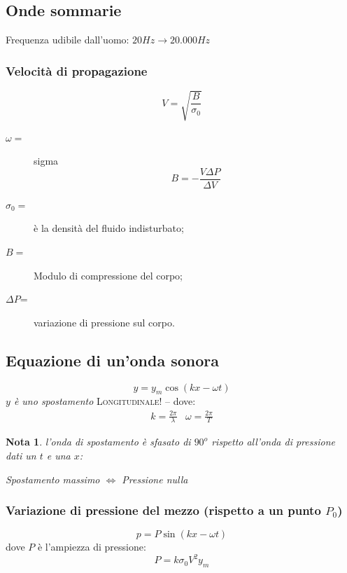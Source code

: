 \documentclass{book}
\newtheorem{nota}{Nota}[section]
\begin{document}
\subsection{Onde sommarie}
\label{sec:ondesom}

Frequenza udibile dall'uomo: $20Hz\to 20.000Hz$

\subsubsection{Velocità di propagazione}
\label{sec:veldiprop}

\begin{equation}
  \label{eq:veldiprop}
  V=\sqrt{\frac{B}{\sigma_0}}
\end{equation}
\begin{description}
\item[$\omega=$] sigma
  \begin{equation*}
    B=-\frac{V\Delta P}{\Delta V}
  \end{equation*}
\item[$\sigma_0=$] è la densità del fluido indisturbato;
\item[$B=$] Modulo di compressione del corpo;
\item[$\Delta P$=] variazione di pressione sul corpo.
\end{description}

\subsection{Equazione di un'onda sonora}
\label{sec:ondson}

\begin{equation}
  \label{eq:ondson}
  y=y_m\cos(kx-\omega t)
\end{equation}
\textit{$y$ è uno spostamento} \textsc{Longitudinale!} -- dove:
\begin{eqnarray}
  \label{eq:ondson2}
  k=\frac{2\pi}{\lambda} & \omega = \frac{2\pi}{T}
\end{eqnarray}
\begin{nota}
  l'onda di spostamento è sfasato di $90^o$ rispetto all'onda di pressione\\
  dati un $t$ e una $x$:
  \begin{center}
    Spostamento massimo $\Leftrightarrow$ Pressione nulla
  \end{center}
\end{nota}

\subsubsection{Variazione di pressione del mezzo (rispetto a un punto $P_0$)}
\label{sec:vardipresdelmezzo}
\begin{equation}
  \label{eq:vardipresdelmezzo}
  p=P\sin(kx-\omega t)
\end{equation}
dove $P$ è l'ampiezza di pressione:
\begin{equation}
  \label{eq:vardipresdelmezzo2}
  P=k\sigma_0V^2y_m
\end{equation}
\end{document}

